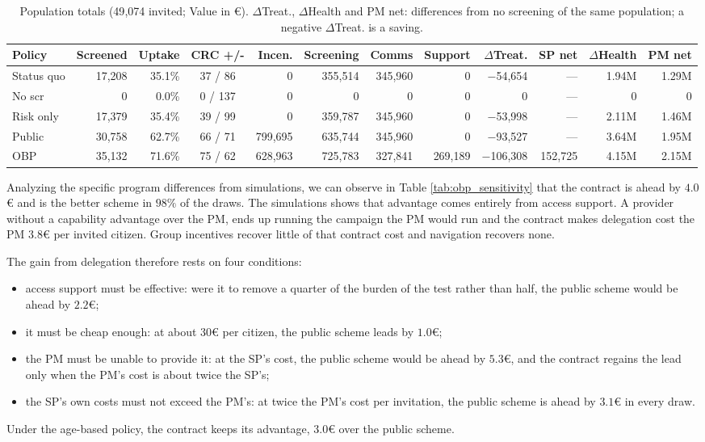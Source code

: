\documentclass[12pt]{article}
\begin{document}
\begin{table}[htbp]
\centering
\scriptsize
\caption{Population totals (49{,}074 invited; Value in €). $\Delta$Treat., $\Delta$Health and PM net: differences from no screening of the same population; a negative $\Delta$Treat. is a saving.}
\label{tab:comparison}
\setlength{\tabcolsep}{4pt}
\begin{tabular}{lrrcrrrrrrrr}
\hline
Policy & Screened & Uptake & CRC +/- & Incen. & Screening & Comms & Support & $\Delta$Treat. & SP net & $\Delta$Health & PM net \\
\hline
Status quo    & 17,208 & 35.1\% & 37 /  86 & 0       & 355,514 & 345,960 & 0       & $-$54,654  & ---     & 1.94M & 1.29M \\
\hline
No scr        & 0      &  0.0\% &  0 / 137 & 0       & 0       & 0       & 0       & 0          & ---     & 0     & 0 \\
Risk only     & 17,379 & 35.4\% & 39 /  99 & 0       & 359,787 & 345,960 & 0       & $-$53,998  & ---     & 2.11M & 1.46M \\
Public        & 30,758 & 62.7\% & 66 /  71 & 799,695 & 635,744 & 345,960 & 0       & $-$93,527  & ---     & 3.64M & 1.95M \\
OBP           & 35,132 & 71.6\% & 75 /  62 & 628,963 & 725,783 & 327,841 & 269,189 & $-$106,308 & 152,725 & 4.15M & 2.15M \\
\hline
\end{tabular}
\end{table}
Analyzing the specific program differences from simulations, we can observe in Table \ref{tab:obp_sensitivity} that the contract is ahead by $4.0$€ and is the better scheme in $98\%$ of the draws. The simulations shows that advantage comes entirely from access support. A provider without a capability advantage over the PM, ends up running the campaign the PM would run and the contract makes delegation cost the PM $3.8$€ per invited citizen. Group incentives recover little of that contract cost and navigation recovers none.

The gain from delegation therefore rests on four conditions:
\begin{itemize}
    \item access support must be effective: were it to remove a quarter of the burden of the test rather than half, the public scheme would be ahead by $2.2$€;
    \item it must be cheap enough: at about 30€ per citizen, the public scheme leads by $1.0$€;
    \item the PM must be unable to provide it: at the SP's cost, the public scheme would be ahead by $5.3$€, and the contract regains the lead only when the PM's cost is about twice the SP's;
    \item the SP's own costs must not exceed the PM's: at twice the PM's cost per invitation, the public scheme is ahead by $3.1$€ in every draw.
\end{itemize}
Under the age-based policy, the contract keeps its advantage, $3.0$€ over the public scheme.
\end{document}
